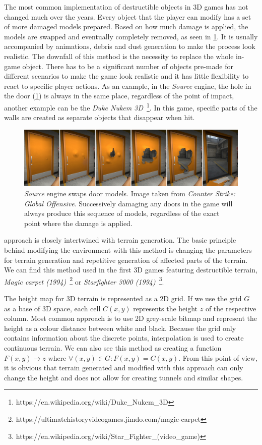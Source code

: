 The most common implementation of destructible objects in 3D games has not changed much over the years. Every object that the player can modify has a set of more damaged models prepared. Based on how much damage is applied, the models are swapped and eventually completely removed, as seen in \cref{fig:doors}. It is usually accompanied by animations, debris and dust generation to make the process look realistic. The downfall of this method is the necessity to replace the whole in-game object. There has to be a significant number of objects pre-made for different scenarios to make the game look realistic and it has little flexibility to react to specific player actions. As an example, in the \emph{Source} engine, the hole in the door (\cref{fig:doors}) is always in the same place, regardless of the point of impact, another example can be the \emph{Duke Nukem 3D}~\footnote{https://en.wikipedia.org/wiki/Duke\_Nukem\_3D}. In this game, specific parts of the walls are created as separate objects that disappear when hit.

\begin{figure} 
\centering
\includegraphics[width=\textwidth]{img/doors}
\caption{\emph{Source} engine swaps door models. Image taken from \emph{Counter Strike: Global Offensive}. Successively damaging any doors in the game will always produce this sequence of models, regardless of the exact point where the damage is applied.}
\label{fig:doors}
\end{figure}

 approach is closely intertwined with terrain generation. The basic principle behind modifying the environment with this method is changing the parameters for terrain generation and repetitive generation of affected parts of the terrain. We can find this method used in the first 3D games featuring destructible terrain, \eg \emph{Magic carpet (1994)}~\footnote{https://ultimatehistoryvideogames.jimdo.com/magic-carpet} or \emph{Starfighter 3000 (1994)}~\footnote{https://en.wikipedia.org/wiki/Star\_Fighter\_(video\_game)}.

The height map for 3D terrain is represented as a 2D grid. If we use the grid $G$ as a base of 3D space, each cell $C(x,y)$ represents the height $z$ of the respective column. Most common approach is to use 2D grey-scale bitmap and represent the height as a colour distance between white and black. Because the grid only contains information about the discrete points, interpolation is used to create continuous terrain. We can also see this method as creating a function $F(x,y) \rightarrow z$ where $\forall (x,y) \in G : F(x,y) = C(x,y)$. From this point of view, it is obvious that terrain generated and modified with this approach can only change the height and does not allow for creating tunnels and similar shapes.

